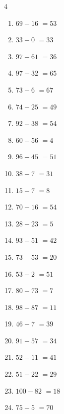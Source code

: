 \begin{multicols}{4}
\begin{enumerate}
  \item $69-16$
        $=53$

  \item $33-0$
        $=33$

  \item $97-61$
        $=36$

  \item $97-32$
        $=65$

  \item $73-6$
        $=67$

  \item $74-25$
        $=49$

  \item $92-38$
        $=54$

  \item $60-56$
        $=4$

  \item $96-45$
        $=51$

  \item $38-7$
        $=31$

  \item $15-7$
        $=8$

  \item $70-16$
        $=54$

  \item $28-23$
        $=5$

  \item $93-51$
        $=42$

  \item $73-53$
        $=20$

  \item $53-2$
        $=51$

  \item $80-73$
        $=7$

  \item $98-87$
        $=11$

  \item $46-7$
        $=39$

  \item $91-57$
        $=34$

  \item $52-11$
        $=41$

  \item $51-22$
        $=29$

  \item $100-82$
        $=18$

  \item $75-5$
        $=70$


\end{enumerate}
\end{multicols}
